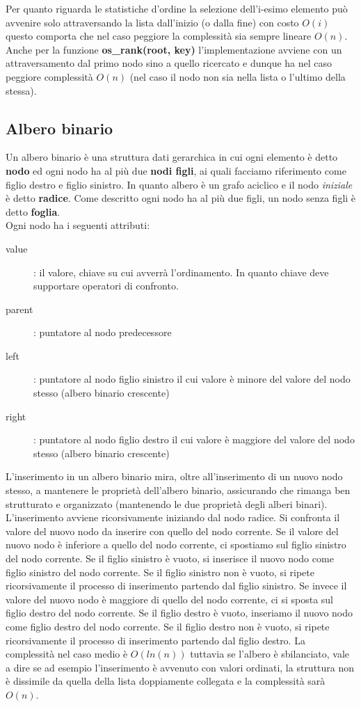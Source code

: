 \documentclass{article}
\begin{document}
\noindent Per quanto riguarda le statistiche d'ordine la selezione dell'i-esimo elemento può avvenire solo attraversando la lista dall'inizio (o dalla fine) con costo $O(i)$ questo comporta che nel caso peggiore la complessità sia sempre lineare $O(n)$. Anche per la funzione \textbf{os\_rank(root, key)} l'implementazione avviene con un attraversamento dal primo nodo sino a quello ricercato e dunque ha nel caso peggiore complessità $O(n)$ (nel caso il nodo non sia nella lista o l'ultimo della stessa).

\subsection*{Albero binario}
Un albero binario è una struttura dati gerarchica in cui ogni elemento è detto \textbf{nodo} ed ogni nodo ha al più due \textbf{nodi figli}, ai quali facciamo riferimento come figlio destro e figlio sinistro. In quanto albero è un grafo aciclico e il nodo \textit{iniziale} è detto \textbf{radice}. Come descritto ogni nodo ha al più due figli, un nodo senza figli è detto \textbf{foglia}. \\

\noindent Ogni nodo ha i seguenti attributi:
\begin{description}
    \item[value]: il valore, chiave su cui avverrà l'ordinamento. In quanto chiave deve supportare operatori di confronto.
    \item[parent]: puntatore al nodo predecessore
    \item[left]: puntatore al nodo figlio sinistro il cui valore è minore del valore del nodo stesso (albero binario crescente)
    \item[right]: puntatore al nodo figlio destro il cui valore è maggiore del valore del nodo stesso (albero binario crescente)
\end{description}

\noindent L'inserimento in un albero binario mira, oltre all'inserimento di un nuovo nodo stesso, a mantenere le proprietà dell'albero binario, assicurando che rimanga ben strutturato e organizzato (mantenendo le due proprietà degli alberi binari). L'inserimento avviene ricorsivamente iniziando dal nodo radice. Si confronta il valore del nuovo nodo da inserire con quello del nodo corrente. Se il valore del nuovo nodo è inferiore a quello del nodo corrente, ci spostiamo sul figlio sinistro del nodo corrente. Se il figlio sinistro è vuoto, si inserisce il nuovo nodo come figlio sinistro del nodo corrente. Se il figlio sinistro non è vuoto, si ripete ricorsivamente il processo di inserimento partendo dal figlio sinistro. Se invece il valore del nuovo nodo è maggiore di quello del nodo corrente, ci si sposta sul figlio destro del nodo corrente. Se il figlio destro è vuoto, inseriamo il nuovo nodo come figlio destro del nodo corrente. Se il figlio destro non è vuoto, si ripete ricorsivamente il processo di inserimento partendo dal figlio destro. La complessità nel caso medio è $O(ln(n))$ tuttavia se l'albero è sbilanciato, vale a dire se ad esempio l'inserimento è avvenuto con valori ordinati, la struttura non è dissimile da quella della lista doppiamente collegata e la complessità sarà $O(n)$.  \\
\end{document}

